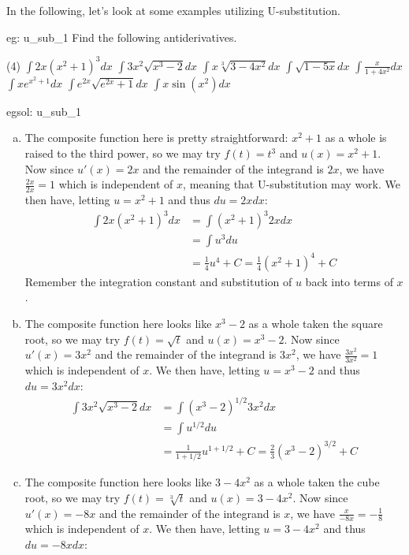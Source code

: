 In the following, let's look at some examples utilizing U-substitution.

\begin{eg}[]{eg: u_sub_1}
    Find the following antiderivatives.
    \begin{tasks}(4)
        \task $\int 2x(x^2+1)^3 dx$
        \task $\int 3x^2\sqrt{x^3-2} dx$
        \task $\int x\sqrt[3]{3-4x^2} dx$
        \task $\int \sqrt{1-5x} dx$
        \task $\int \frac{x}{1+4x^2} dx$
        \task $\int xe^{x^2+1} dx$
        \task $\int e^{2x}\sqrt{e^{2x}+1} dx$
        \task $\int x\sin(x^2) dx$ 
    \end{tasks}
\end{eg}

\begin{egsol}[]{egsol: u_sub_1}
    \begin{enumerate}[a)]
        \item The composite function here is pretty straightforward: $x^2+1$ as a whole is raised to the third power, so we may try $f(t) = t^3$ and $u(x) = x^2+1$.  Now since $u'(x) = 2x$ and the remainder of the integrand is $2x$, we have $\frac{2x}{2x} = 1$ which is independent of $x$, meaning that U-substitution may work.  We then have, letting $u = x^2+1$ and thus $du = 2xdx$:
        \begin{align*}
            \int 2x(x^2+1)^3 dx &= \int (x^2+1)^3 2xdx\\
            &= \int u^3 du\\
            &= \frac{1}{4}u^4 + C = \frac{1}{4}(x^2+1)^4 + C
        \end{align*}
        Remember the integration constant and substitution of $u$ back into terms of $x$.
        \item The composite function here looks like $x^3-2$ as a whole taken the square root, so we may try $f(t) = \sqrt{t}$ and $u(x) = x^3 - 2$.  Now since $u'(x) = 3x^2$ and the remainder of the integrand is $3x^2$, we have $\frac{3x^2}{3x^2} = 1$ which is independent of $x$.  We then have, letting $u = x^3 - 2$ and thus $du = 3x^2dx$:
        \begin{align*}
            \int 3x^2\sqrt{x^3-2} dx &= \int (x^3-2)^{1/2} 3x^2dx\\
            &= \int u^{1/2} du\\
            &= \frac{1}{1+1/2}u^{1+1/2} + C = \frac{2}{3}(x^3-2)^{3/2} + C
        \end{align*}
        \item The composite function here looks like $3-4x^2$ as a whole taken the cube root, so we may try $f(t) = \sqrt[3]{t}$ and $u(x) = 3 - 4x^2$.  Now since $u'(x) = -8x$ and the remainder of the integrand is $x$, we have $\frac{x}{-8x} = -\frac{1}{8}$ which is independent of $x$.  We then have, letting $u = 3 - 4x^2$ and thus $du = -8xdx$:

\end{enumerate}
\end{egsol}
